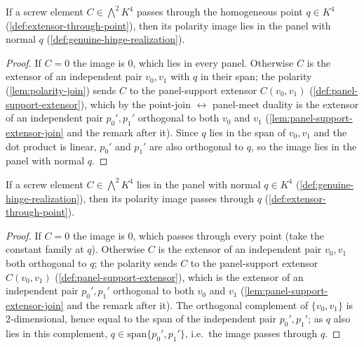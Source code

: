\begin{lemma}
  \label{lem:pencil-transport-through-to-in}
  \leanok
  If a screw element $C \in \bigwedge^{2} K^{4}$ passes through the
  homogeneous point $q \in K^4$ (\cref{def:extensor-through-point}),
  then its polarity image lies in the panel with normal $q$
  (\cref{def:genuine-hinge-realization}).
\end{lemma}
\begin{proof}
  \leanok
  If $C = 0$ the image is $0$, which lies in every panel. Otherwise $C$
  is the extensor of an independent pair $v_0, v_1$ with $q$ in their
  span; the polarity (\cref{lem:polarity-join}) sends
  $C$ to the panel-support extensor $C(v_0,v_1)$
  (\cref{def:panel-support-extensor}), which by the point-join
  $\leftrightarrow$ panel-meet duality is the extensor of an
  independent pair $p_0', p_1'$ orthogonal to both $v_0$ and $v_1$
  (\cref{lem:panel-support-extensor-join} and the remark after it).
  Since $q$ lies in the span of $v_0, v_1$ and the dot product is
  linear, $p_0'$ and $p_1'$ are also orthogonal to $q$, so the image
  lies in the panel with normal $q$.
\end{proof}

\begin{lemma}
  \label{lem:pencil-transport-in-to-through}
  \leanok
  If a screw element $C \in \bigwedge^{2} K^{4}$ lies in the panel
  with normal $q \in K^4$ (\cref{def:genuine-hinge-realization}), then
  its polarity image passes through $q$
  (\cref{def:extensor-through-point}).
\end{lemma}
\begin{proof}
  \leanok
  If $C = 0$ the image is $0$, which passes through every point (take
  the constant family at $q$). Otherwise $C$ is the extensor of an
  independent pair $v_0, v_1$ both orthogonal to $q$; the polarity
  sends $C$ to the panel-support extensor $C(v_0,v_1)$
  (\cref{def:panel-support-extensor}), which is the extensor of an
  independent pair $p_0', p_1'$ orthogonal to both $v_0$ and $v_1$
  (\cref{lem:panel-support-extensor-join} and the remark after it).
  The orthogonal complement of $\{v_0,v_1\}$ is $2$-dimensional, hence
  equal to the span of the independent pair $p_0', p_1'$; as $q$ also
  lies in this complement, $q \in \mathrm{span}\{p_0',p_1'\}$, i.e.\ the
  image passes through $q$.
\end{proof}


